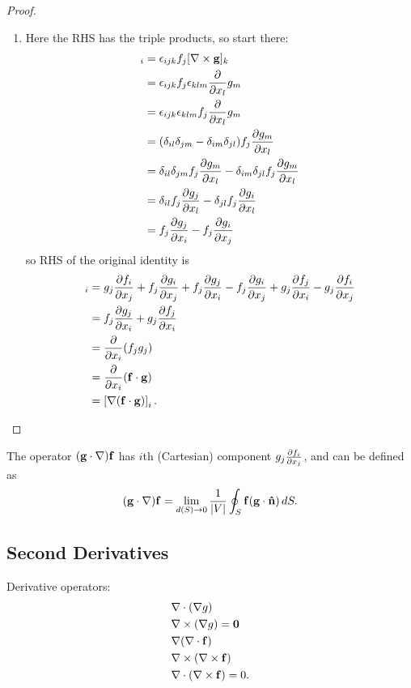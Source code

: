 \documentclass[10pt, a4paper]{article}
\begin{document}
\begin{proposition}[continues = mathmethII:prop:prodrules]
\begin{proof}
\begin{enumerate}[label = (\arabic*)]
            \item[(6)]
            Here the RHS has the triple products,
            so start there:
            \begin{align*}
                 [\vec{f}\times(\bnabla \times \vec{g})]_i &= \epsilon_{ijk}f_j[\bnabla \times \vec{g}]_k \\
                &= \epsilon_{ijk}f_j\epsilon_{klm}\pd{x_l}g_m \\
                &= \epsilon_{ijk}\epsilon_{klm}f_j\pd{x_l}g_m \\
                &= (\delta_{il}\delta_{jm} - \delta_{im}\delta_{jl})f_j\pd[g_m]{x_l} \\
                &= \delta_{il}\delta_{jm}f_j\pd[g_m]{x_l} - \delta_{im}\delta_{jl}f_j\pd[g_m]{x_l} \\
                &= \delta_{il}f_j\pd[g_j]{x_l} - \delta_{jl}f_j\pd[g_i]{x_l} \\
                &= f_j\pd[g_j]{x_i} - f_j\pd[g_i]{x_j}
            \end{align*}
            so RHS of the original identity is
            \begin{align*}
                []_i &= g_j\pd[f_i]{x_j} + f_j\pd[g_i]{x_j} + f_j\pd[g_j]{x_i} - f_j\pd[g_i]{x_j} + g_j\pd[f_j]{x_i} - g_j\pd[f_i]{x_j} \\
                &= f_j\pd[g_j]{x_i} + g_j\pd[f_j]{x_i} \\
                &= \pd{x_i}(f_jg_j) \\
                &= \pd{x_i}(\vec{f} \cdot \vec{g}) \\
                &= \left[\bnabla(\vec{f} \cdot \vec{g})\right]_i.
            \end{align*}
        \end{enumerate}
    \end{proof}
\end{proposition}

\begin{remark}
    The operator $(\vec{g} \cdot \bnabla)\vec{f}$ has $i$th
    (Cartesian)
    component $g_j\pd[f_i]{x_j}$,
    and can be defined as
    \[
    (\vec{g} \cdot \bnabla)\vec{f} = \lim_{d(S) \to 0}\frac{1}{|V|}\oint_{S}\vec{f}(\vec{g}\cdot\hvec{n})\,dS.
    \]
\end{remark}

\subsection{Second Derivatives}
Derivative operators:
\begin{align*}
    &\bnabla \cdot (\bnabla g) \\
    &\bnabla \times (\bnabla g) = \vec{0} \\
    &\bnabla(\bnabla \cdot \vec{f}) \\
    &\bnabla \times (\bnabla \times \vec{f}) \\
    &\bnabla \cdot (\bnabla \times \vec{f}) = 0.
\end{align*}
\end{document}
